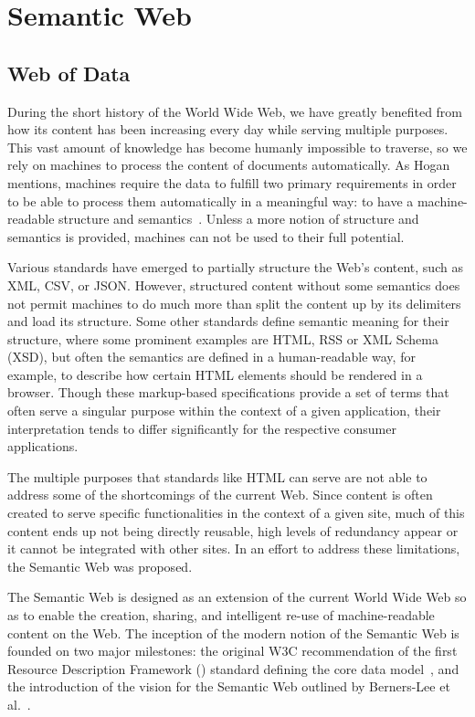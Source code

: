 \section{Semantic Web}
\label{cap2:semWeb}

\subsection{Web of Data}
\label{cap2:semWeb/webOfData}
During the short history of the World Wide Web, we have greatly benefited from how its 
content has been increasing every day while serving multiple purposes. This vast amount of 
knowledge has become humanly impossible to traverse, so we rely on machines to 
process the content of documents automatically. As Hogan mentions, machines require the 
data to fulfill two primary requirements in order to be able to process them automatically 
in a meaningful way: to have a machine-readable structure and semantics~\cite{key:linked14-Hogan}. 
Unless a more  notion of structure and semantics is provided, machines can not 
be used to their full potential.

Various standards have emerged to partially structure the Web’s content, such as XML, CSV, 
or JSON. However, structured content without some semantics does not permit machines to do 
much more than split the content up by its delimiters and load its structure. Some other 
standards define semantic meaning for their structure, where some prominent examples are 
HTML, RSS or XML Schema (XSD), but often the semantics are defined in a human-readable way, 
for example, to describe how certain HTML elements should be rendered in a browser. Though 
these markup-based specifications provide a set of terms that often serve a singular purpose 
within the context of a given application, their interpretation tends to differ significantly 
for the respective consumer applications. 

The multiple purposes that standards like HTML can serve are not able to address some of the 
shortcomings of the current Web. Since content is often created to serve specific functionalities 
in the context of a given site, much of this content ends up not being directly reusable, 
high levels of redundancy appear or it cannot be integrated with other sites. In an effort 
to address these limitations, the Semantic Web was proposed.

The Semantic Web is designed as an extension of the current World Wide Web so as to enable 
the creation, sharing, and intelligent re-use of machine-readable content on the Web. The 
inception of the modern notion of the Semantic Web is founded on two major milestones: the 
original W3C recommendation of the first Resource Description Framework (\RDF{}) standard 
defining the core data model~\cite{key:oldrdf}, and the introduction of the vision for the 
Semantic Web outlined by Berners-Lee et al.~\cite{key:semwebsa}.

